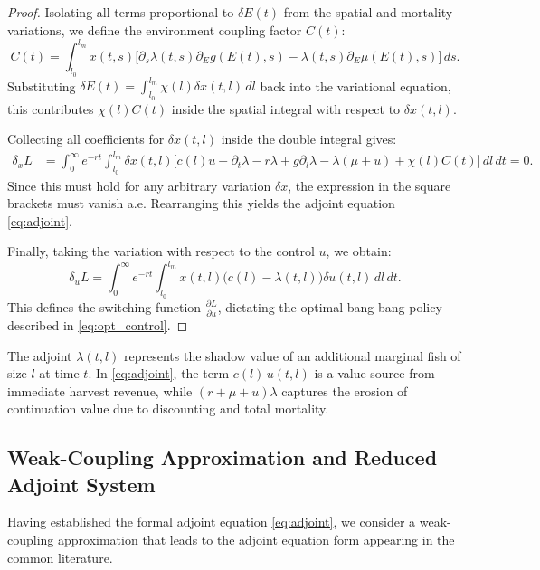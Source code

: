 \documentclass[pdflatex,sn-mathphys-num]{sn-jnl}
\theoremstyle{thmstyleone}
\theoremstyle{definition}
\theoremstyle{remark}
\begin{document}
\begin{proof}
Isolating all terms proportional to $\delta E(t)$ from the spatial and mortality variations, we define the environment coupling factor $C(t)$:
\[
C(t) = \int_{l_0}^{l_m} x(t,s)\Big[ \partial_s\lambda(t,s)\partial_Eg(E(t),s) - \lambda(t,s)\partial_E\mu(E(t),s) \Big]\,ds.
\]
Substituting $\delta E(t) = \int_{l_0}^{l_m} \chi(l)\delta x(t,l)\,dl$ back into the variational equation, this contributes $\chi(l)C(t)$ inside the spatial integral with respect to $\delta x(t,l)$.

Collecting all coefficients for $\delta x(t,l)$ inside the double integral gives:
\begin{align*}
\delta_x L &= \int_0^\infty e^{-rt} \int_{l_0}^{l_m} \delta x(t,l) \Bigg[ c(l)u + \partial_t \lambda - r\lambda + g\partial_l\lambda - \lambda(\mu + u) + \chi(l)C(t) \Bigg]\,dl\,dt = 0.
\end{align*}
Since this must hold for any arbitrary variation $\delta x$, the expression in the square brackets must vanish a.e. Rearranging this yields the adjoint equation \eqref{eq:adjoint}.

Finally, taking the variation with respect to the control $u$, we obtain:
\[
\delta_u L = \int_0^\infty e^{-rt} \int_{l_0}^{l_m} x(t,l)\big( c(l) - \lambda(t,l) \big)\delta u(t,l)\,dl\,dt.
\]
This defines the switching function $\frac{\partial L}{\partial u}$, dictating the optimal bang-bang policy described in \eqref{eq:opt_control}.
\end{proof}

The adjoint $\lambda(t,l)$ represents the shadow value of an additional marginal fish
of size $l$ at time $t$. In \eqref{eq:adjoint}, the term $c(l)\,u(t,l)$ is a value
source from immediate harvest revenue, while $(r+\mu+u)\lambda$ captures the erosion of
continuation value due to discounting and total mortality.

\subsection{Weak-Coupling Approximation and Reduced Adjoint System}
\label{subsec:weak}

Having established the formal adjoint equation \eqref{eq:adjoint}, we consider a weak-coupling approximation that leads to the adjoint equation form appearing in the common literature.
\end{document}

